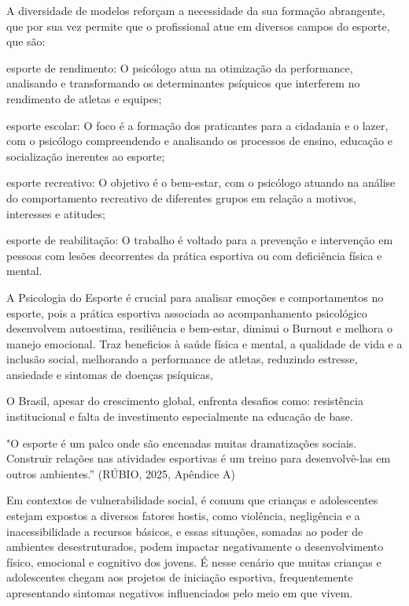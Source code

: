 \begin{Desenvolvimento}
A diversidade de modelos reforçam a necessidade da sua formação abrangente, que por sua vez permite que o profissional atue em diversos campos do esporte, que são:
\begin{alinea}
  \item esporte de rendimento: O psicólogo atua na otimização da performance, analisando e transformando os determinantes psíquicos que interferem no rendimento de atletas e equipes;
  \item esporte escolar: O foco é a formação dos praticantes para a cidadania e o lazer, com o psicólogo compreendendo e analisando os processos de ensino, educação e socialização inerentes ao esporte;
  \item esporte recreativo: O objetivo é o bem-estar, com o psicólogo atuando na análise do comportamento recreativo de diferentes grupos em relação a motivos, interesses e atitudes;
  \item esporte de reabilitação: O trabalho é voltado para a prevenção e intervenção em pessoas com lesões decorrentes da prática esportiva ou com deficiência física e mental.
\end{alinea}

A Psicologia do Esporte é crucial para analisar emoções e comportamentos no esporte, pois a prática esportiva associada ao acompanhamento psicológico desenvolvem autoestima, resiliência e bem-estar, diminui o Burnout e melhora o manejo emocional. Traz beneficios à saúde física e mental, a qualidade de vida e a inclusão social, melhorando a performance de atletas, reduzindo estresse, ansiedade e sintomas de doenças psíquicas,

O Brasil, apesar do crescimento global, enfrenta desafios como: resistência institucional e falta de investimento especialmente na educação de base.

"O esporte é um palco onde são encenadas muitas dramatizações sociais. Construir relações nas atividades esportivas é um treino para desenvolvê-las em outros ambientes.” (RÚBIO, 2025, Apêndice A)

Em contextos de vulnerabilidade social, é comum que crianças e adolescentes estejam expostos a diversos fatores hostis, como violência, negligência e a inacessibilidade a recursos básicos, e essas situações, somadas ao poder de ambientes desestruturados, podem impactar negativamente o desenvolvimento físico, emocional e cognitivo dos jovens. É nesse cenário que muitas crianças e adolescentes chegam aos projetos de iniciação esportiva, frequentemente apresentando sintomas negativos influenciados pelo meio em que vivem.


\end{Desenvolvimento}
